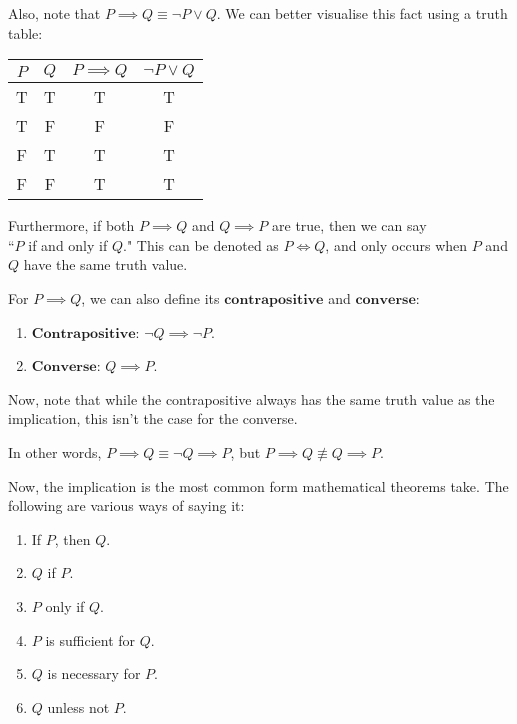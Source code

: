 \documentclass[openany]{book}
\begin{document}
Also, note that $P\implies Q\equiv\neg P\lor Q$. We can better visualise this fact using a truth table:

\begin{center}
	\begin{tabular}{|c|c||c|c|}
		\hline
		$P$ & $Q$ & $P\implies Q$ & $\neg P\lor Q$ \\
		\hline
		T & T & T & T \\
		T & F & F & F \\
		F & T & T & T \\
		F & F & T & T \\
		\hline
	\end{tabular}
\end{center}

Furthermore, if both $P \implies Q$ and $Q\implies P$ are true, then we can say \\ ``$P$ if and only if $Q$." This can be denoted as $P\iff Q$, and only occurs when $P$ and $Q$ have the same truth value.

\begin{defn}
	For $P\implies Q$, we can also define its $\textbf{contrapositive}$ and $\textbf{converse}$:
	\begin{enumerate}
		\item $\textbf{Contrapositive}$: $\neg Q\implies\neg P$.
		\item $\textbf{Converse}$: $Q\implies P$.
	\end{enumerate}
\end{defn}

Now, note that while the contrapositive always has the same truth value as the implication, this isn't the case for the converse.

In other words, $P\implies Q\equiv\neg Q\implies P$, but $P\implies Q\not\equiv Q\implies P$.

Now, the implication is the most common form mathematical theorems take. The following are various ways of saying it:
\begin{enumerate}
	\item If $P$, then $Q$.
	\item $Q$ if $P$.
	\item $P$ only if $Q$.
	\item $P$ is sufficient for $Q$.
	\item $Q$ is necessary for $P$.
	\item $Q$ unless not $P$.
\end{enumerate}
\end{document}
